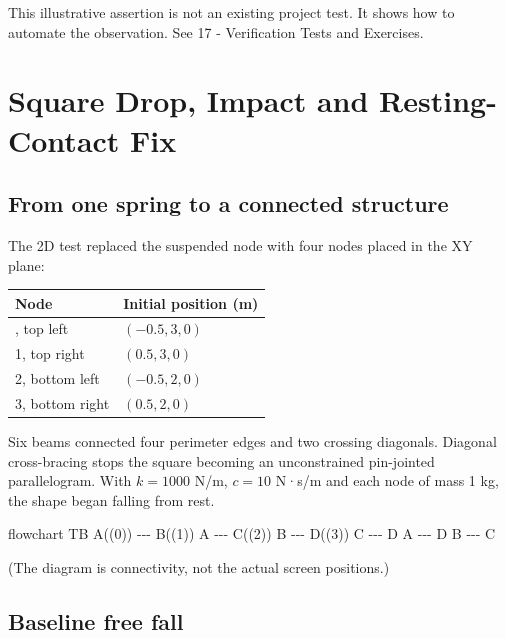 \documentclass[
  10pt,
  a4paper,
]{article}
\newenvironment{Shaded}{\begin{snugshade}}{\end{snugshade}}
\newcommand{\NormalTok}[1]{#1}
\begin{document}
This illustrative assertion is not an existing project test. It shows
how to automate the observation. See 17 - Verification Tests and
Exercises.

\newpage

\section{Square Drop, Impact and Resting-Contact
Fix}\label{square-drop-impact-and-resting-contact-fix}

\subsection{From one spring to a connected
structure}\label{from-one-spring-to-a-connected-structure}

The 2D test replaced the suspended node with four nodes placed in the XY
plane:

\begin{longtable}[]{@{}ll@{}}
\toprule\noalign{}
Node & Initial position (m) \\
\midrule\noalign{}
\endhead
\bottomrule\noalign{}
\endlastfoot
0, top left & \((-0.5,3,0)\) \\
1, top right & \((0.5,3,0)\) \\
2, bottom left & \((-0.5,2,0)\) \\
3, bottom right & \((0.5,2,0)\) \\
\end{longtable}

Six beams connected four perimeter edges and two crossing diagonals.
Diagonal cross-bracing stops the square becoming an unconstrained
pin-jointed parallelogram. With \(k=1000\) N/m, \(c=10\) N·s/m and each
node of mass 1 kg, the shape began falling from rest.

\begin{Shaded}
\begin{Highlighting}[]
\NormalTok{flowchart TB}
\NormalTok{ A((0)) {-}{-}{-} B((1))}
\NormalTok{ A {-}{-}{-} C((2))}
\NormalTok{ B {-}{-}{-} D((3))}
\NormalTok{ C {-}{-}{-} D}
\NormalTok{ A {-}{-}{-} D}
\NormalTok{ B {-}{-}{-} C}
\end{Highlighting}
\end{Shaded}

(The diagram is connectivity, not the actual screen positions.)

\subsection{Baseline free fall}\label{baseline-free-fall}
\end{document}
